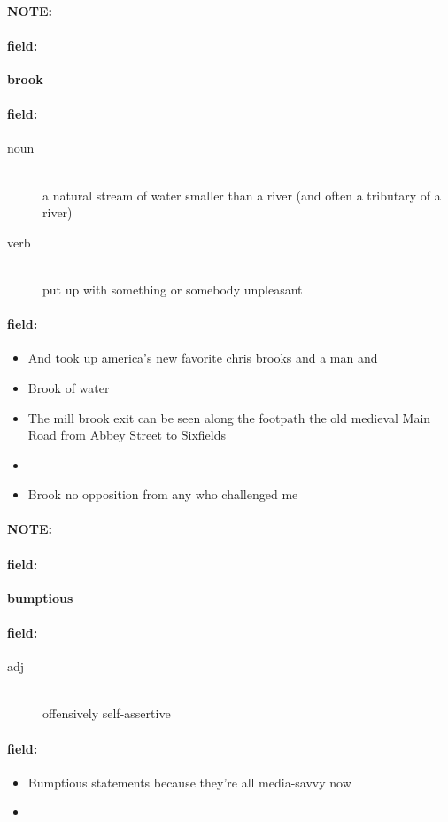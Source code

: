 \documentclass[12pt]{article}
\newenvironment{note}{\paragraph{NOTE:}}{}
\newenvironment{field}{\paragraph{field:}}{}
\begin{document}
\begin{note}
\begin{field}
\textbf{\large brook}
\end{field}


\begin{field}
\begin{description}
\item[noun] \hfill \\ 
a natural stream of water smaller than a river (and often a tributary of a river)

\item[verb] \hfill \\ 
put up with something or somebody unpleasant

\end{description}
\end{field}

\begin{field}
\begin{itemize}
\item And took up america's new favorite chris brooks and a man and
\item Brook of water
\item The mill brook exit can be seen along the footpath  the old medieval Main Road  from Abbey Street to Sixfields
\item 
\item Brook no opposition from any who challenged me
\end{itemize}
\end{field}
\end{note}
\begin{note}
\begin{field}
\textbf{\large bumptious}
\end{field}


\begin{field}
\begin{description}
\item[adj] \hfill \\ 
offensively self-assertive

\end{description}
\end{field}

\begin{field}
\begin{itemize}
\item Bumptious statements because they're all media-savvy now
\item 
\end{itemize}
\end{field}
\end{note}
\end{document}
